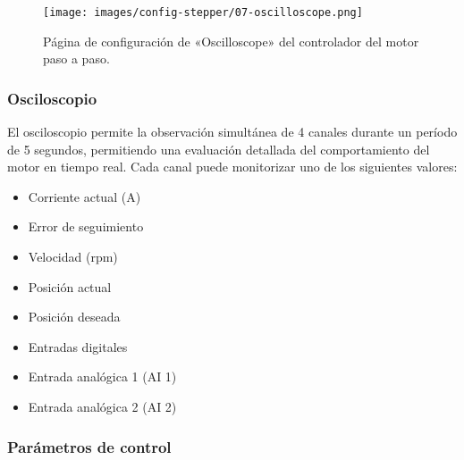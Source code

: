 \documentclass[english,spanish,a4paper,11pt]{article}
\begin{document}
\begin{figure}[!ht]
    \centering
    \texttt{[image: images/config-stepper/07-oscilloscope.png]}
    \caption{Página de configuración de «Oscilloscope» del controlador del motor paso a paso.}
    \label{fig:conf_brushless_7}
\end{figure}

\subsubsection{Osciloscopio}

 El osciloscopio permite la observación simultánea de 4 canales durante un período de 5 segundos, permitiendo una evaluación detallada del comportamiento del motor en tiempo real. Cada canal puede monitorizar uno de los siguientes valores:
 
 \begin{itemize}
     \item Corriente actual (\unit{\A})
     \item Error de seguimiento
     \item Velocidad (\unit{rpm})
     \item Posición actual
     \item Posición deseada
     \item Entradas digitales
     \item Entrada analógica 1 (AI 1)
     \item Entrada analógica 2 (AI 2)
 \end{itemize}


\subsubsection{Parámetros de control}
\label{sec:oscilloscope_parameters}
\end{document}

